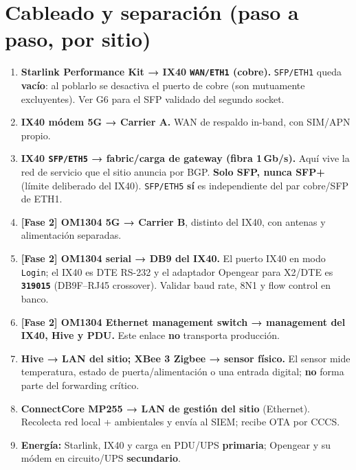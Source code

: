 \documentclass[11pt,a4paper]{article}
\newcommand{\file}[1]{\texttt{#1}}
\begin{document}
\section{Cableado y separación (paso a paso, por sitio)}

\begin{enumerate}
  \item \textbf{Starlink Performance Kit → IX40 \file{WAN/ETH1} (cobre).}
        \file{SFP/ETH1} queda \textbf{vacío}: al poblarlo se desactiva el puerto de cobre
        (son mutuamente excluyentes). Ver G6 para el SFP validado del segundo socket.

  \item \textbf{IX40 módem 5G → Carrier A.} WAN de respaldo in-band, con SIM/APN propio.

  \item \textbf{IX40 \file{SFP/ETH5} → fabric/carga de gateway (fibra 1\,Gb/s).}
        Aquí vive la red de servicio que el sitio anuncia por BGP.
        \textbf{Solo SFP, nunca SFP+} (límite deliberado del IX40).
        \file{SFP/ETH5} \textbf{sí} es independiente del par cobre/SFP de ETH1.

  \item \textbf{[Fase 2] OM1304 5G → Carrier B}, distinto del IX40, con antenas y
        alimentación separadas.

  \item \textbf{[Fase 2] OM1304 serial → DB9 del IX40.} El puerto IX40 en modo \file{Login};
        el IX40 es DTE RS-232 y el adaptador Opengear para X2/DTE es \textbf{\texttt{319015}}
        (DB9F–RJ45 crossover). Validar baud rate, 8N1 y flow control en banco.

  \item \textbf{[Fase 2] OM1304 Ethernet management switch → management del IX40, Hive y PDU.}
        Este enlace \textbf{no} transporta producción.

  \item \textbf{Hive → LAN del sitio; XBee 3 Zigbee → sensor físico.}
        El sensor mide temperatura, estado de puerta/alimentación o una entrada digital;
        \textbf{no} forma parte del forwarding crítico.

  \item \textbf{ConnectCore MP255 → LAN de gestión del sitio} (Ethernet).
        Recolecta red local + ambientales y envía al SIEM; recibe OTA por CCCS.

  \item \textbf{Energía:} Starlink, IX40 y carga en PDU/UPS \textbf{primaria};
        Opengear y su módem en circuito/UPS \textbf{secundario}.
\end{enumerate}
\end{document}
